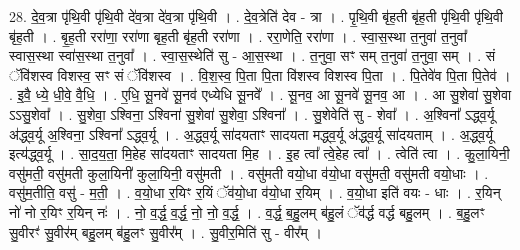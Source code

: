 \documentclass[17pt]{extarticle}
\begin{document}
28. दे॒व॒त्रा पृ॑थि॒वी पृ॑थि॒वी दे॑व॒त्रा दे॑व॒त्रा पृ॑थि॒वी । . दे॒व॒त्रेति॑ देव - त्रा । . पृ॒थि॒वी बृ॑ह॒ती बृ॑ह॒ती पृ॑थि॒वी पृ॑थि॒वी बृ॑ह॒ती । . बृ॒ह॒ती ररा॑णा॒ ररा॑णा बृह॒ती बृ॑ह॒ती ररा॑णा । . ररा॒णेति॒ ररा॑णा । . स्वा॒स॒स्था त॒नुवा॑ त॒नुवा᳚ स्वास॒स्था स्वा॑स॒स्था त॒नुवा᳚ । . स्वा॒स॒स्थेति॑ सु - आ॒स॒स्था । . त॒नुवा॒ सꣳ सम् त॒नुवा॑ त॒नुवा॒ सम् । . सं ॅवि॑शस्व विशस्व॒ सꣳ सं ॅवि॑शस्व । . वि॒श॒स्व॒ पि॒ता पि॒ता वि॑शस्व विशस्व पि॒ता । . पि॒तेवे॑व पि॒ता पि॒तेव॑ । . इ॒वै॒ ध्ये॒ धी॒वे॒ वै॒धि॒ । . ए॒धि॒ सू॒नवे॑ सू॒नव॑ एध्येधि सू॒नवे᳚ । . सू॒नव॒ आ सू॒नवे॑ सू॒नव॒ आ । . आ सु॒शेवा॑ सु॒शेवा ऽऽसु॒शेवा᳚ । . सु॒शेवा॒ ऽश्विना॒ ऽश्विना॑ सु॒शेवा॑ सु॒शेवा॒ ऽश्विना᳚ । . सु॒शेवेति॑ सु - शेवा᳚ । . अ॒श्विना᳚ ऽद्ध्व॒र्यू अ॑द्ध्व॒र्यू अ॒श्विना॒ ऽश्विना᳚ ऽद्ध्व॒र्यू । . अ॒द्ध्व॒र्यू सा॑दयताꣳ सादयता मद्ध्व॒र्यू अ॑द्ध्व॒र्यू सा॑दयताम् । . अ॒द्ध्व॒र्यू इत्य॑द्ध्व॒र्यू । . सा॒द॒य॒ता॒ मि॒हेह सा॑दयताꣳ सादयता मि॒ह । . इ॒ह त्वा᳚ त्वे॒हेह त्वा᳚ । . त्वेति॑ त्वा । . कु॒ला॒यिनी॒ वसु॑मती॒ वसु॑मती कुला॒यिनी॑ कुला॒यिनी॒ वसु॑मती । . वसु॑मती वयो॒धा व॑यो॒धा वसु॑मती॒ वसु॑मती वयो॒धाः । . वसु॑म॒तीति॒ वसु॑ - म॒ती॒ । . व॒यो॒धा र॒यिꣳ र॒यिं ॅव॑यो॒धा व॑यो॒धा र॒यिम् । . व॒यो॒धा इति॑ वयः - धाः । . र॒यिन् नो॑ नो र॒यिꣳ र॒यिन् नः॑ । . नो॒ व॒र्द्ध॒ व॒र्द्ध॒ नो॒ नो॒ व॒र्द्ध॒ । . व॒र्द्ध॒ ब॒हु॒लम् ब॑हु॒लं ॅव॑र्द्ध वर्द्ध बहु॒लम् । . ब॒हु॒लꣳ सु॒वीरꣳ॑ सु॒वीर॑म् बहु॒लम् ब॑हु॒लꣳ सु॒वीर᳚म् । . सु॒वीर॒मिति॑ सु - वीर᳚म् । \newline
\end{document}
